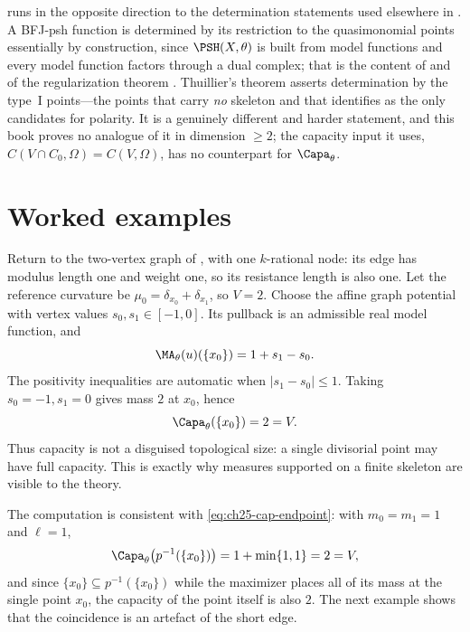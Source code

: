 \begin{remark}
\label{rem:ch25-thuillier-determination}
 runs in the opposite direction to
the determination statements used elsewhere in .  A
BFJ-psh function is determined by its restriction to the quasimonomial
points essentially by construction, since \(\PSH(X,\theta)\) is built from
model functions and every model function factors through a dual complex; that
is the content of  and of the
regularization theorem .  Thuillier's
theorem asserts determination by the type~\(\mathrm{I}\) points---the points
that carry \emph{no} skeleton and that
 identifies as the only candidates for
polarity.  It is a genuinely different and harder statement, and this book
proves no analogue of it in dimension \(\geq2\); the capacity input it uses,
\(C(V\cap C_0,\Omega)=C(V,\Omega)\), has no counterpart for
\(\Capa_\theta\).
\end{remark}

\section{Worked examples}
\label{sec:ch25-worked}

\begin{example}
\label{ex:ch25-two-vertex-full-capacity}
Return to the two-vertex graph of , with one
\(k\)-rational node: its edge has modulus length one and weight one,
so its resistance length is also one.  Let the reference curvature be
\(\mu_0=\delta_{x_0}+\delta_{x_1}\), so \(V=2\).
Choose the affine graph potential with vertex values
\(s_0,s_1\in[-1,0]\).  Its pullback is an admissible real model
function, and
\[
 \MA_\theta(u)(\{x_0\})=1+s_1-s_0.
\]
The positivity inequalities are automatic when \(|s_1-s_0|\leq1\). Taking
\(s_0=-1,s_1=0\) gives mass \(2\) at \(x_0\), hence
\[
                 \Capa_\theta(\{x_0\})=2=V.
\]
Thus capacity is not a disguised topological size: a single divisorial point
may have full capacity. This is exactly why measures supported on a finite
skeleton are visible to the theory.
\end{example}

The computation is consistent with
\eqref{eq:ch25-cap-endpoint}: with \(m_0=m_1=1\) and \(\ell=1\),
\[
 \Capa_\theta\bigl(p^{-1}(\{x_0\})\bigr)=1+\min\{1,1\}=2=V,
\]
and since \(\{x_0\}\subseteq p^{-1}(\{x_0\})\) while the maximizer places all
of its mass at the single point \(x_0\), the capacity of the point itself is
also \(2\).  The next example shows that the coincidence is an artefact of
the short edge.

